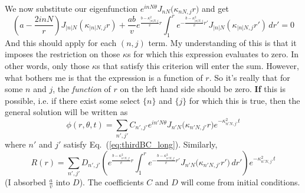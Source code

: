 \documentclass{article}
\begin{document}
We now substitute our eigenfunction $e^{i nN\theta}J_{nN}\bigl(\kappa_{nN,j} r\bigr)$ and get
\begin{equation}
\label{eq:thirdBC_long}
\left(a  - \frac{2inN}{r} \right)J_{|n|N}(\kappa_{|n|N, j} r) + \frac{ab}{v}e^{\frac{b-\kappa_{|n|N, j}^2}{v} r}\int_1^r e^{-\frac{b-\kappa_{|n|N, j}^2}{v} r'} J_{|n|N}(\kappa_{|n|N, j} r') \,dr'  = 0
\end{equation}
And this should apply for each $(n,j)$ term.  My understanding of this is that it imposes the restriction on those $\kappa$s for which this expression evaluates to zero.  In other words, only those $\kappa$s that satisfy this criterion will enter the sum.  However, what bothers me is that the expression is a function of $r$.  So it's really that for some $n$ and $j$, the \emph{function} of $r$ on the left hand side should be zero. \textbf{If} this is possible, i.e. if there exist some select $\{n\}$ and $\{j\}$ for which this is true, then the general solution will be written as 
\begin{equation}
\phi(r,\theta,t) = \sum_{n', j'} C_{n', j'} e^{i n'N\theta}J_{n'N}\bigl(\kappa_{n'N,j'} r\bigr) e^{-\kappa^2_{n'N,j'} t}
\end{equation}
where $n'$ and $j'$ satisfy Eq.~(\ref{eq:thirdBC_long}).  Similarly,
\begin{equation}
R(r) = \sum_{n', j'} D_{n',j'}\left(e^{\frac{b-\kappa_{n'N,j'}^2}{v} r}\int_1^r e^{-\frac{b-\kappa_{n'N,j'}^2}{v} r'} J_{n'N}\bigl(\kappa_{n'N,j'} r'\bigr) \,dr'\right)e^{-\kappa^2_{n'N,j'} t}
\end{equation}
(I absorbed $\frac{a}{v}$ into $D$).  The coefficients $C$ and $D$ will come from initial conditions. 
\newpage
\end{document}

